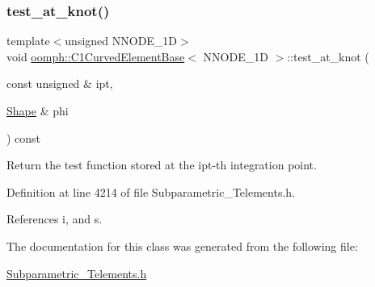 \subsubsection{\texorpdfstring{test\+\_\+at\+\_\+knot()}{test\_at\_knot()}}
{\footnotesize\ttfamily template$<$unsigned N\+N\+O\+D\+E\+\_\+1D$>$ \\
void \hyperlink{classoomph_1_1C1CurvedElementBase}{oomph\+::\+C1\+Curved\+Element\+Base}$<$ N\+N\+O\+D\+E\+\_\+1D $>$\+::test\+\_\+at\+\_\+knot (\begin{DoxyParamCaption}\item[{const unsigned \&}]{ipt,  }\item[{\hyperlink{classoomph_1_1Shape}{Shape} \&}]{phi }\end{DoxyParamCaption}) const\hspace{0.3cm}{\ttfamily [inline]}}



Return the test function stored at the ipt-\/th integration point. 



Definition at line 4214 of file Subparametric\+\_\+\+Telements.\+h.



References i, and s.



The documentation for this class was generated from the following file\+:\begin{DoxyCompactItemize}
\item 
\hyperlink{Subparametric__Telements_8h}{Subparametric\+\_\+\+Telements.\+h}\end{DoxyCompactItemize}
